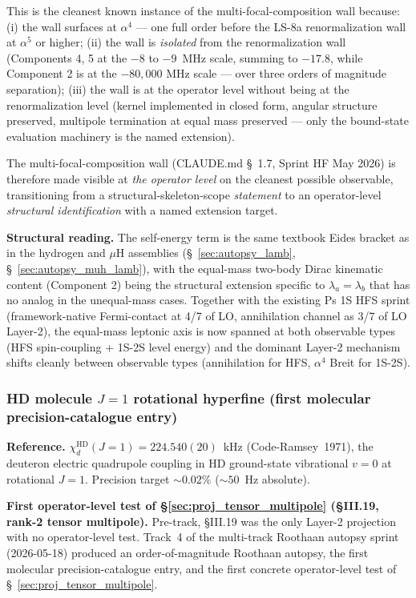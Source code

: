 \documentclass[11pt]{article}
\begin{document}
This is the cleanest known instance of the multi-focal-composition wall
because: (i) the wall surfaces at $\alpha^4$ --- one full order before
the LS-8a renormalization wall at $\alpha^5$ or higher; (ii) the wall
is \emph{isolated} from the renormalization wall (Components 4, 5 at
the $-8$ to $-9$~MHz scale, summing to $-17.8$, while Component 2 is at
the $-80{,}000$ MHz scale --- over three orders of magnitude
separation); (iii) the wall is at
the operator level without being at the renormalization level (kernel
implemented in closed form, angular structure preserved, multipole
termination at equal mass preserved --- only the bound-state evaluation
machinery is the named extension).

The multi-focal-composition wall (CLAUDE.md \S~1.7, Sprint HF May 2026)
is therefore made visible at \emph{the operator level} on the cleanest
possible observable, transitioning from a structural-skeleton-scope
\emph{statement} to an operator-level \emph{structural identification}
with a named extension target.

\textbf{Structural reading.}  The self-energy term is the same textbook
Eides bracket as in the hydrogen and $\mu$H assemblies
(\S~\ref{sec:autopsy_lamb}, \S~\ref{sec:autopsy_muh_lamb}), with the
equal-mass two-body Dirac kinematic content (Component 2) being the
structural extension specific to $\lambda_a = \lambda_b$ that has no analog in
the unequal-mass cases.  Together with the existing Ps 1S HFS sprint
(framework-native Fermi-contact at 4/7 of LO, annihilation channel as
3/7 of LO Layer-2), the equal-mass leptonic axis is now spanned at
both observable types (HFS spin-coupling + 1S-2S level energy) and the
dominant Layer-2 mechanism shifts cleanly between observable types
(annihilation for HFS, $\alpha^4$ Breit for 1S-2S).

\subsubsection{HD molecule $J=1$ rotational hyperfine (first molecular precision-catalogue entry)}
\label{sec:autopsy_HD_rotational_HFS}

\textbf{Reference.}  $\chi_d^\text{HD}(J=1) = 224.540(20)$~kHz
(Code-Ramsey~1971), the deuteron electric quadrupole coupling in
HD ground-state vibrational $v=0$ at rotational $J=1$.  Precision target $\sim 0.02\%$
($\sim 50$~Hz absolute).

\textbf{First operator-level test of \S\ref{sec:proj_tensor_multipole}
(\S III.19, rank-2 tensor multipole).}  Pre-track, \S III.19 was
the only Layer-2 projection with no operator-level test.  Track~4
of the multi-track Roothaan autopsy sprint (2026-05-18) produced
an order-of-magnitude Roothaan autopsy, the first
molecular precision-catalogue entry, and the first concrete
operator-level test of \S~\ref{sec:proj_tensor_multipole}.
\end{document}
